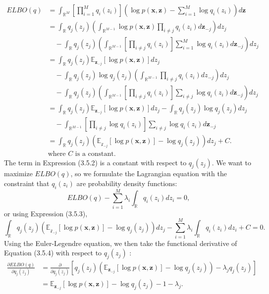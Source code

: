 \documentclass[honours,12pt]{unswthesis}
\newcommand{\R}{\mathbb{R}}
\numberwithin{equation}{section}
\theoremstyle{definition}
\begin{document}
\begin{align}
ELBO(q)&= \int_{\R^M}\left[\prod^M_{i=1}q_i(z_i)\right]\left(\log p(\bm{x},\bm{z})-\sum_{i=1}^M\log q_i(z_i)\right)d\bm{z}\nonumber\\
&= \int_{\R}q_j(z_j)\left(\int_{\R^{M-1}}\log p(\bm{x},\bm{z})\prod_{i\neq j}q_i(z_i)d\bm{z}_{-j} \right) dz_j\nonumber\\
&\quad -\int_{\R}q_j(z_j)\left(\int_{\R^{M-1}}\left[\prod_{i\neq j}q_i(z_i)\right]\sum_{i=1}^M \log q_i(z_i)d\bm{z}_{-j}\right)dz_j\nonumber\\
&= \int_{\R}q_j(z_j)\mathbb{E}_{\bm{z}_{-j}}[\log p(\bm{x},\bm{z})]dz_j\nonumber\\
&\quad -\int_{\R}q_j(z_j)\log q_j(z_j)\left(\int_{\R^{M-1}}\prod_{i\neq j}q_i(z_i)dz_{-j}\right) dz_j\nonumber\\
&\quad -\int_{\R}q_j(z_j)\left(\int_{\R^{M-1}}\left[\prod_{i\neq j}q_i(z_i)\right]\sum_{i\neq j}\log q_i(z_i)d{\bm{z}_{-j}}\right)dz_j\nonumber\\
&= \int_\R q_j(z_j)\mathbb{E}_{\bm{z}_{-j}}[\log p(\bm{x},\bm{z})]dz_j-\int_\R q_j(z_j)\log q_j(z_j)dz_j\nonumber\\
&\quad -\int_{\R^{M-1}}\left[\prod_{i\neq j}\log q_i(z_i)\right]\sum_{i\neq j}\log q_i(z_i)d{\bm{z}_{-j}}
\\&= \int_{\R}q_j(z_j)\left(\mathbb{E}_{\mathcal{z}_{-j}}[\log p(\bm{x},\bm{z})]-\log q_j(z_j)\right)dz_j+C.\\
&\text{where }C\text{ is a constant.}\nonumber
\end{align}
The term in Expression (3.5.2) is a constant with respect to $q_j(z_j)$. We want to maximize $ELBO(q)$, so we formulate the Lagrangian equation with the constraint that $q_i(z_i)$ are probability density functions:
\begin{equation*}
ELBO(q)-\sum^M_{i=1}\lambda_i\int_\R q_i(z_i)dz_i=0,
\end{equation*}
or using Expression (3.5.3),
\begin{equation}
\int_\R q_j(z_j)\left(\mathbb{E}_{\mathcal{z}_{-j}}[\log p(\bm{x},\bm{z})]-\log q_j(z_j)\right)dz_j-\sum^M_{i=1}\lambda_i\int_\R q_i(z_i)dz_i+C=0.
\end{equation} 
Using the Euler-Legendre equation, we then take the functional derivative of Equation (3.5.4) with respect to $q_j(z_j)$ \citep{pattern}:
\begin{align}
\frac{\partial ELBO(q)}{\partial q_j(z_j)}&= \frac{\partial}{\partial q_j(z_j)}\left[q_j(z_j)\left(\mathbb{E}_{\bm{z}_{-j}}[\log p(\bm{x},\bm{z})]-\log q_j(z_j)\right)-\lambda_jq_j(z_j)\right]\nonumber
\\&= \mathbb{E}_{\bm{z}_{-j}}[\log p(\bm{x},\bm{z})]-\log q_j(z_j)-1-\lambda_j.
\end{align}
\end{document}
